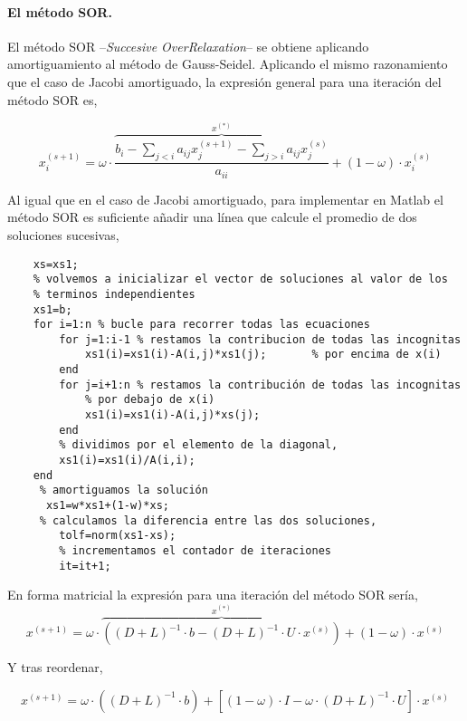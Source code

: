 \paragraph{El método SOR.} El método SOR --\emph{Succesive OverRelaxation}-- se obtiene aplicando amortiguamiento al método de Gauss-Seidel. Aplicando el mismo razonamiento que el caso de Jacobi amortiguado, la expresión general para una iteración del método SOR es,

\begin{equation*}
x_i^{(s+1)}=\omega\cdot \overbrace{\frac{b_i-\sum_{j< i}a_{ij}x_j^{(s+1)}-\sum_{j> i}a_{ij}x_j^{(s)}}{a_{ii}}}^{x^{(*)}}+(1-\omega)\cdot x_i^{(s)}
\end{equation*}

Al igual que en el caso de Jacobi amortiguado, para implementar en Matlab el método SOR es suficiente añadir una línea que calcule el promedio de dos soluciones sucesivas,

\begin{lstlisting}
    xs=xs1;
    % volvemos a inicializar el vector de soluciones al valor de los
    % terminos independientes
    xs1=b; 
    for i=1:n % bucle para recorrer todas las ecuaciones
        for j=1:i-1 % restamos la contribucion de todas las incognitas
            xs1(i)=xs1(i)-A(i,j)*xs1(j);       % por encima de x(i)
        end
        for j=i+1:n % restamos la contribución de todas las incognitas
            % por debajo de x(i)
            xs1(i)=xs1(i)-A(i,j)*xs(j);
        end
        % dividimos por el elemento de la diagonal,
        xs1(i)=xs1(i)/A(i,i);
    end
     % amortiguamos la solución
      xs1=w*xs1+(1-w)*xs;
     % calculamos la diferencia entre las dos soluciones,
        tolf=norm(xs1-xs);
        % incrementamos el contador de iteraciones
        it=it+1;
\end{lstlisting}

En forma matricial la expresión para una iteración del método SOR sería,
\begin{equation*}
x^{(s+1)}= \omega\cdot\overbrace{\left((D+L)^{-1}\cdot b-(D+L)^{-1}\cdot U\cdot x^{(s)}\right)}^{x^{(*)}}+(1-\omega)\cdot x^{(s)}
\end{equation*}

Y tras reordenar,

\begin{equation*}
x^{(s+1)}= \omega\cdot\left((D+L)^{-1}\cdot b\right)+\left[(1-\omega)\cdot I-\omega\cdot(D+L)^{-1}\cdot U\right]\cdot x^{(s)}
\end{equation*}

